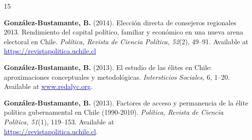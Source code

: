 \begin{publications}
\begin{benumerate}{15}

\item{{\bfseries González-Bustamante, B.} (2014). Elección directa de consejeros regionales 2013. Rendimiento del capital político, familiar y económico en una nueva arena electoral en Chile. {\itshape Política, Revista de Ciencia Política, 52}(2), 49--91. Available at \href{https://revistapolitica.uchile.cl/index.php/RP/article/view/36137}{\textcolor{blue}{https://revistapolitica.uchile.cl}}} \vspace{1mm}


\item{{\bfseries González-Bustamante, B.} (2013). El estudio de las élites en Chile: aproximaciones conceptuales y metodológicas. {\itshape Intersticios Sociales,} 6, 1--20. Available at \href{https://www.redalyc.org/articulo.oa?id=421739499004}{\textcolor{blue}{www.redalyc.org}}.} \vspace{1mm}


\item{{\bfseries González-Bustamante, B.} (2013). Factores de acceso y permanencia de la élite política gubernamental en Chile (1990-2010). {\itshape Política, Revista de Ciencia Política, 51}(1), 119--153. Available at \\ \href{https://revistapolitica.uchile.cl/index.php/RP/article/view/27436}{\textcolor{blue}{https://revistapolitica.uchile.cl}}.} \vspace{1mm} %


\end{benumerate}
\end{publications}
